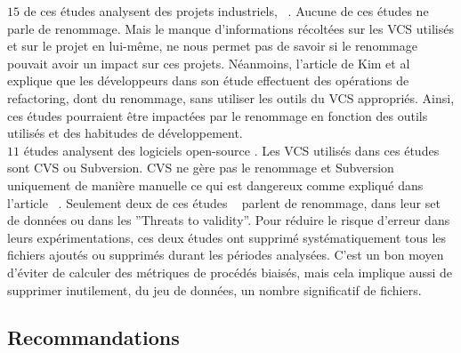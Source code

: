 $15$ de ces études analysent des projets industriels, ~\cite{arisholm_systematic_2010,graves_predicting_2000,khoshgoftaar_using_2000,layman_iterative_2008,munson_code_1998,nagappan_use_2005,nagappan_influence_2008,nagappan_using_2007,nagappan_using_2006,nagappan_change_2010,nikora_building_2006,ostrand_programmer-based_2010,weyuker_too_2008,weyuker_using_2007,yuan_application_2000}. Aucune de ces études ne parle de renommage. Mais le manque d'informations récoltées sur les VCS utilisés et sur le projet en lui-même, ne nous permet pas de savoir si le renommage pouvait avoir un impact sur ces projets. Néanmoins, l'article de Kim et al ~\cite{kim_field_2012} explique que les développeurs dans son étude effectuent des opérations de refactoring, dont du renommage, sans utiliser les outils du VCS appropriés. Ainsi, ces études pourraient être impactées par le renommage en fonction des outils utilisés et des habitudes de développement.\\

$11$ études analysent des logiciels open-source \cite{dambros_relationship_2009,bacchelli_are_2010,caglayan_merits_2009,dambros_evaluating_2012,dambros_evaluating_2012,dambros_extensive_2010,illes-seifert_exploring_2010,li_finding_2005,matsumoto_analysis_2010,moser_analysis_2008,moser_comparative_2008,schroter_if_2006}. Les VCS utilisés dans ces études sont CVS ou Subversion. CVS ne gère pas le renommage et Subversion uniquement de manière manuelle ce qui est dangereux comme expliqué dans l'article ~\cite{lavoie_inferring_2012,steidl_incremental_2014}. Seulement deux de ces études ~\cite{moser_analysis_2008,moser_comparative_2008} parlent de renommage, dans leur set de données ou dans les ''Threats to validity''. Pour réduire le risque d'erreur dans leurs expérimentations, ces deux études ont supprimé systématiquement tous les fichiers ajoutés ou supprimés durant les périodes analysées. C'est un bon moyen d'éviter de calculer des métriques de procédés biaisés, mais cela implique aussi de supprimer inutilement, du jeu de données, un nombre significatif de fichiers.\\

\subsection{Recommandations}
\label{sec:guidelines}


